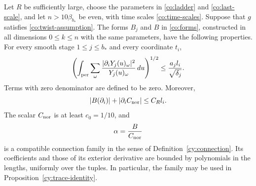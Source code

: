 \begin{proposition}
\label{co:connection}
Let $R$ be sufficiently large, choose the parameters in
\eqref{co:ladder} and \eqref{co:last-scale}, and let $n>10\beta_{b_*}$
be even, with time scales \eqref{co:time-scales}.  Suppose that $g$
satisfies \eqref{co:twist-assumption}.  The forms $B_j$ and $B$ in
\eqref{co:forms}, constructed in all dimensions $0\leq k\leq n$ with the
same parameters, have the following properties.  For every smooth stage
$1\leq j\leq b_*$ and every coordinate $t_i$,
\begin{equation}
 \left(\int_{\rm per}\sum_\omega
        \frac{|\partial_iY_j(u)_\omega|^2}{Y_j(u)_\omega}\,du
 \right)^{1/2}
 \leq\frac{a_jl_i}{\sqrt{\delta_j}}.
 \label{co:fisher}
\end{equation}
Terms with zero denominator are defined to be zero.  Moreover,
\begin{equation}
 |B(\partial_i)|+|\partial_iC_{\rm nor}|\leq C_Rl_i.
 \label{co:coefficients}
\end{equation}
The scalar $C_{\rm nor}$ is at least $c_0=1/10$, and
\begin{equation}
 \alpha=\frac{B}{C_{\rm nor}}
 \label{co:normalized}
\end{equation}
is a compatible connection family in the sense of
Definition~\ref{cy:connection}.  Its coefficients and those of its
exterior derivative are bounded by polynomials in the lengths, uniformly
over the tuples.  In particular, the family may be used in
Proposition~\ref{cy:trace-identity}.
\end{proposition}


